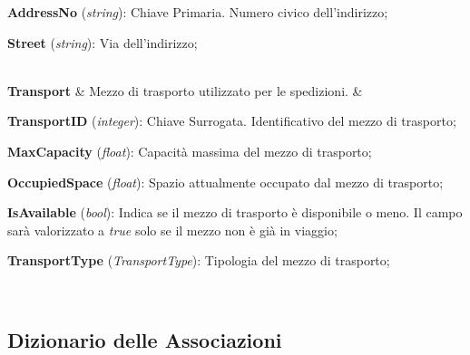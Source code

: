 {{  \textbf{AddressNo} (\textit{string}): Chiave Primaria. Numero civico dell'indirizzo; 

  \textbf{Street} (\textit{string}): Via dell'indirizzo;
  }\\

  \textbf{Transport} & Mezzo di trasporto utilizzato per le spedizioni. & 
  {\footnotesize
  \textbf{TransportID} (\textit{integer}): Chiave Surrogata. Identificativo del mezzo di trasporto;

  \textbf{MaxCapacity} (\textit{float}): Capacità massima del mezzo di trasporto;

  \textbf{OccupiedSpace} (\textit{float}): Spazio attualmente occupato dal mezzo di trasporto;

  \textbf{IsAvailable} (\textit{bool}): Indica se il mezzo di trasporto è disponibile o meno. Il campo sarà valorizzato a \textit{true} solo se il mezzo non è già in viaggio;
  
  \textbf{TransportType} (\textit{TransportType}): Tipologia del mezzo di trasporto;
  }\\

}

\subsection{Dizionario delle Associazioni}

